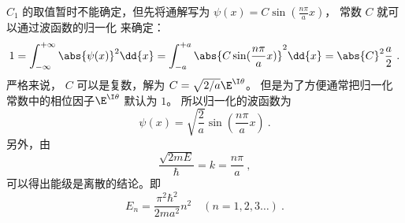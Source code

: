 $C_1$ 的取值暂时不能确定，但先将通解写为 $\psi(x) = C\sin(\frac{n\pi }{a}x)$， 常数 $C$ 就可以通过波函数的归一化%
来确定：
\begin{equation}
1 = \int_{-\infty }^{+\infty } \abs{\psi(x)}^2 \dd{x}  = \int_{-a}^{+a} \abs{C\sin(\frac{n\pi }{a} x)}^2 \dd{x}  = \abs{C}^2 \frac{a}{2}~.
\end{equation}
严格来说， $C$ 可以是复数，解为 $C = \sqrt{2/a} \E^{\I\theta}$。 但是为了方便通常把归一化常数中的相位因子$\E^{\I\theta}$ 默认为 $1$。 所以归一化的波函数为
\begin{equation}
\psi(x) = \sqrt{\frac{2}{a}} \sin(\frac{n\pi }{a}x)~.
\end{equation}
另外，由
\begin{equation}
\frac{\sqrt{2mE}}{\hbar} = k = \frac{n\pi }{a}~,
\end{equation}
可以得出能级是离散的结论。即
\begin{equation}
E_n = \frac{\pi^2\hbar^2}{2m a^2} n^2 \quad (n = 1,2,3\dots)~.
\end{equation}
